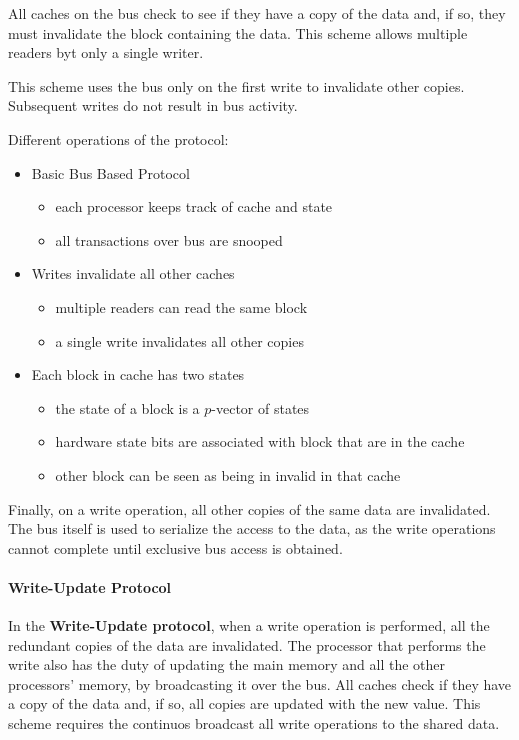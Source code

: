 \documentclass[english]{article}
\begin{document}
All caches on the bus check to see if they have a copy of the data and, if so, they must invalidate the block containing the data.
This scheme allows multiple readers byt only a single writer.

This scheme uses the bus only on the first write to invalidate other copies.
Subsequent writes do not result in bus activity.

\bigskip
Different operations of the protocol:

\begin{itemize}
  \item Basic Bus Based Protocol
        \begin{itemize}
          \item each processor keeps track of cache and state
          \item all transactions over bus are snooped
        \end{itemize}
  \item Writes invalidate all other caches
        \begin{itemize}
          \item multiple readers can read the same block
          \item a single write invalidates all other copies
        \end{itemize}
  \item Each block in cache has two states
        \begin{itemize}
          \item the state of a block is a \(p\)-vector of states
          \item hardware state bits are associated with block that are in the cache
          \item other block can be seen as being in invalid in that cache
        \end{itemize}
\end{itemize}

\bigskip
Finally, on a write operation, all other copies of the same data are invalidated.
The bus itself is used to serialize the access to the data, as the write operations cannot complete until exclusive bus access is obtained.

\paragraph{Write-Update Protocol}

In the \textbf{Write-Update protocol}, when a write operation is performed, all the redundant copies of the data are invalidated.
The processor that performs the write also has the duty of updating the main memory and all the other processors' memory, by broadcasting it over the bus.
All caches check if they have a copy of the data and, if so, all copies are updated with the new value.
This scheme requires the continuos broadcast all write operations to the shared data.
\end{document}
